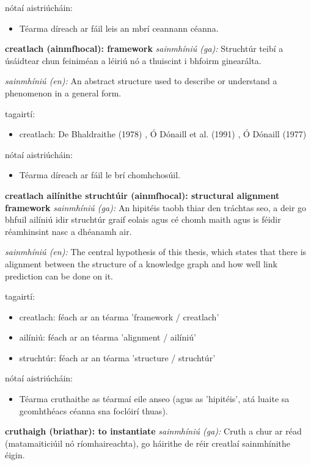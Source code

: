 \documentclass{article}
\begin{document}
nótaí aistriúcháin:
\begin{itemize}
	\item Téarma díreach ar fáil leis an mbrí ceannann céanna.
\end{itemize}


\textbf{creatlach (ainmfhocal): framework}
\textit{sainmhíniú (ga):} Struchtúr teibí a úsáidtear chun feiniméan a léiriú nó a thuiscint i bhfoirm ginearálta.

\textit{sainmhíniú (en):} An abstract structure used to describe or understand a phenomenon in a general form.

tagairtí:
\begin{itemize}
	\item creatlach: De Bhaldraithe (1978) \cite{de-bhaldraithe}, Ó Dónaill et al. (1991) \cite{focloir-beag}, Ó Dónaill (1977) \cite{odonaill}
\end{itemize}

nótaí aistriúcháin:
\begin{itemize}
	\item Téarma díreach ar fáil le brí chomhchosúil.
\end{itemize}


\textbf{creatlach ailínithe struchtúir (ainmfhocal): structural alignment framework}
\textit{sainmhíniú (ga):} An hipitéis taobh thiar den tráchtas seo, a deir go bhfuil ailíniú idir struchtúr graif eolais agus cé chomh maith agus is féidir réamhinsint nasc a dhéanamh air.

\textit{sainmhíniú (en):} The central hypothesis of this thesis, which states that there is alignment between the structure of a knowledge graph and how well link prediction can be done on it.

tagairtí:
\begin{itemize}
	\item creatlach: féach ar an téarma 'framework / creatlach'
	\item ailíniú: féach ar an téarma 'alignment / ailíniú'
	\item struchtúr: féach ar an téarma 'structure / struchtúr'
\end{itemize}

nótaí aistriúcháin:
\begin{itemize}
	\item Téarma cruthaithe as téarmaí eile anseo (agus as 'hipitéis', atá luaite sa gcomhthéacs céanna sna foclóirí thuas).
\end{itemize}


\textbf{cruthaigh (briathar): to instantiate}
\textit{sainmhíniú (ga):} Cruth a chur ar réad (matamaiticiúil nó ríomhaireachta), go háirithe de réir creatlaí sainmhínithe éigin.
\end{document}
